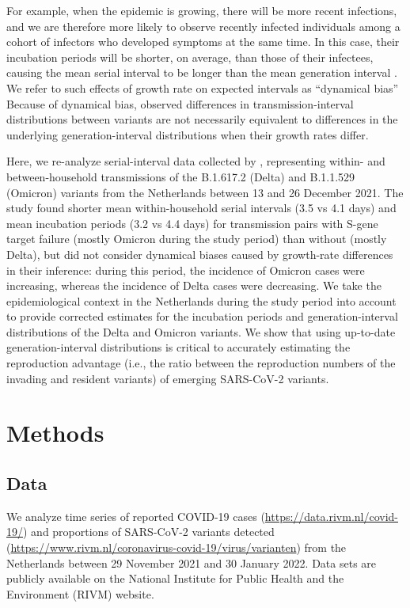 \documentclass[12pt]{article}
\begin{document}
For example, when the epidemic is growing, there will be more recent infections, and we are therefore more likely to observe recently infected individuals among a cohort of infectors who developed symptoms at the same time.
In this case, their incubation periods will be shorter, on average, than those of their infectees, causing the mean serial interval to be longer than the mean generation interval \citep{park2021forward}.
We refer to such effects of growth rate on expected intervals as ``dynamical bias''
Because of dynamical bias, observed differences in transmission-interval distributions between variants are not necessarily equivalent to differences in the underlying generation-interval distributions when their growth rates differ.

Here, we re-analyze serial-interval data collected by \citep{backer2021omicron}, representing within- and between-household transmissions of the B.1.617.2 (Delta) and B.1.1.529 (Omicron) variants from the Netherlands between 13 and 26 December 2021.
The study found shorter mean within-household serial intervals (3.5 vs 4.1 days) and mean incubation periods (3.2 vs 4.4 days) for transmission pairs with S-gene target failure (mostly Omicron during the study period) than without (mostly Delta), but did not consider dynamical biases caused by growth-rate differences in their inference:
during this period, the incidence of Omicron cases were increasing, whereas the incidence of Delta cases were decreasing.
We take the epidemiological context in the Netherlands during the study period into account to provide corrected estimates for the incubation periods and generation-interval distributions of the Delta and Omicron variants.
We show that using up-to-date generation-interval distributions is critical to accurately estimating the reproduction advantage (i.e., the ratio between the reproduction numbers of the invading and resident variants) of emerging SARS-CoV-2 variants.

\section{Methods}

\subsection{Data}

We analyze time series of reported COVID-19 cases (\url{https://data.rivm.nl/covid-19/}) and proportions of SARS-CoV-2 variants detected (\url{https://www.rivm.nl/coronavirus-covid-19/virus/varianten}) from the Netherlands between 29 November 2021 and 30 January 2022.
Data sets are publicly available on the National Institute for Public Health and the Environment (RIVM) website.
\end{document}
